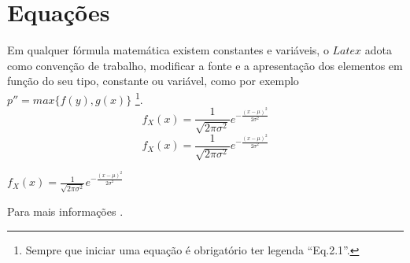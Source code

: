 \section{Equações}
Em qualquer fórmula matemática existem constantes e variáveis, o $Latex$ adota como convenção de
trabalho, modificar a fonte e a apresentação dos elementos em função do seu tipo, constante ou variável, como por exemplo  $p''=max\{f(y),g(x)\}$ \footnote{Sempre que iniciar uma equação é obrigatório ter legenda ``Eq.2.1''.}.
\begin{equation}
    f_X(x) = \frac{1}{\sqrt{2 \pi \sigma^2}}e^{-\frac{(x-\mu)^2}{2\sigma^2}}
\end{equation}
\begin{equation*}
    f_X(x) = \frac{1}{\sqrt{2 \pi \sigma^2}}e^{-\frac{(x-\mu)^2}{2\sigma^2}}
\end{equation*}
\begin{center}
    $f_X(x) = \frac{1}{\sqrt{2 \pi \sigma^2}}e^{-\frac{(x-\mu)^2}{2\sigma^2}}$
\end{center}\par
Para mais informações \cite{overleafsimbolos,simbolos}.
